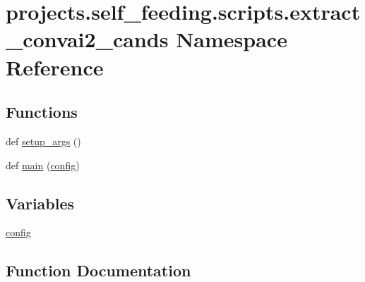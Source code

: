 \hypertarget{namespaceprojects_1_1self__feeding_1_1scripts_1_1extract__convai2__cands}{}\section{projects.\+self\+\_\+feeding.\+scripts.\+extract\+\_\+convai2\+\_\+cands Namespace Reference}
\label{namespaceprojects_1_1self__feeding_1_1scripts_1_1extract__convai2__cands}
\subsection*{Functions}
\begin{DoxyCompactItemize}
\item 
def \hyperlink{namespaceprojects_1_1self__feeding_1_1scripts_1_1extract__convai2__cands_a195803e64ff287a8e844a00e6a24ceef}{setup\+\_\+args} ()
\item 
def \hyperlink{namespaceprojects_1_1self__feeding_1_1scripts_1_1extract__convai2__cands_a6b1b88203a7adfdd0cf791d83425209b}{main} (\hyperlink{namespaceprojects_1_1self__feeding_1_1scripts_1_1extract__convai2__cands_a127d0bf4e35dc3f7abdc031ee15ea333}{config})
\end{DoxyCompactItemize}
\subsection*{Variables}
\begin{DoxyCompactItemize}
\item 
\hyperlink{namespaceprojects_1_1self__feeding_1_1scripts_1_1extract__convai2__cands_a127d0bf4e35dc3f7abdc031ee15ea333}{config}
\end{DoxyCompactItemize}


\subsection{Function Documentation}
\mbox{\label{namespaceprojects_1_1self__feeding_1_1scripts_1_1extract__convai2__cands_a6b1b88203a7adfdd0cf791d83425209b}} 
